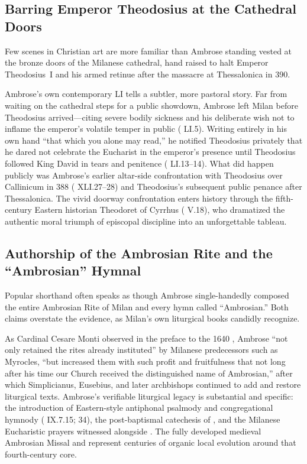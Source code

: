\subsection{Barring Emperor Theodosius at the Cathedral Doors}

Few scenes in Christian art are more familiar than Ambrose standing vested at the bronze doors of the Milanese cathedral, hand raised to halt Emperor Theodosius~I and his armed retinue after the massacre at Thessalonica in 390.

Ambrose's own contemporary  LI tells a subtler, more pastoral story. Far from waiting on the cathedral steps for a public showdown, Ambrose left Milan before Theodosius arrived---citing severe bodily sickness and his deliberate wish not to inflame the emperor's volatile temper in public ( LI.5). Writing entirely in his own hand ``that which you alone may read,'' he notified Theodosius privately that he dared not celebrate the Eucharist in the emperor's presence until Theodosius followed King David in tears and penitence ( LI.13--14). What did happen publicly was Ambrose's earlier altar-side confrontation with Theodosius over Callinicum in 388 ( XLI.27--28) and Theodosius's subsequent public penance after Thessalonica. The vivid doorway confrontation enters history through the fifth-century Eastern historian Theodoret of Cyrrhus ( V.18), who dramatized the authentic moral triumph of episcopal discipline into an unforgettable tableau.

\subsection{Authorship of the Ambrosian Rite and the ``Ambrosian'' Hymnal}

Popular shorthand often speaks as though Ambrose single-handedly composed the entire Ambrosian Rite of Milan and every hymn called ``Ambrosian.'' Both claims overstate the evidence, as Milan's own liturgical books candidly recognize.

As Cardinal Cesare Monti observed in the preface to the 1640 , Ambrose ``not only retained the rites already instituted'' by Milanese predecessors such as Myrocles, ``but increased them with such profit and fruitfulness that not long after his time our Church received the distinguished name of Ambrosian,'' after which Simplicianus, Eusebius, and later archbishops continued to add and restore liturgical texts. Ambrose's verifiable liturgical legacy is substantial and specific: the introduction of Eastern-style antiphonal psalmody and congregational hymnody ( IX.7.15;  34), the post-baptismal catechesis of , and the Milanese Eucharistic prayers witnessed alongside . The fully developed medieval Ambrosian Missal and  represent centuries of organic local evolution around that fourth-century core.

